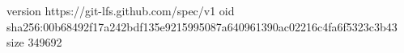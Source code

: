 version https://git-lfs.github.com/spec/v1
oid sha256:00b68492f17a242bdf135e9215995087a640961390ac02216c4fa6f5323c3b43
size 349692
